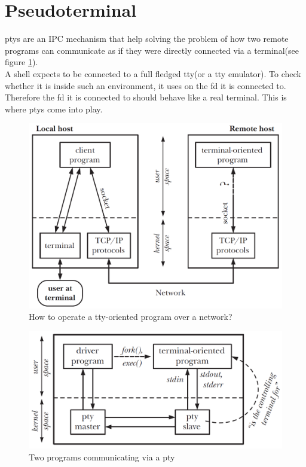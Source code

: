 \documentclass[10pt,a4paper,titlepage,twoside,english,final]{zhawreprt}
\begin{document}
\section{Pseudoterminal}\label{sec:Pseudoterminal}
\glspl{pty} are an \gls{IPC} mechanism that help solving the problem of how two remote programs can communicate as if they were directly connected via a \gls{terminal}(see figure \ref{fig:HowToOperateTtyOrientedProgramOverNetwork}).\\
A \gls{shell} expects to be connected to a full fledged \gls{tty}(or a \gls{tty} emulator). To check whether it is inside such an environment, it uses \cite{isatty} on the \gls{fd} it is connected to. Therefore the \gls{fd} it is connected to should behave like a real \gls{terminal}. This is where \glspl{pty} come into play.
\begin{figure}[ht]
\includegraphics[width=\textwidth]{PseudoterminalProblem}
\caption{How to operate a \gls{tty}-oriented program over a network?\citep[p.1376]{KerriskTLPI}}
\label{fig:HowToOperateTtyOrientedProgramOverNetwork}
\end{figure}
\begin{figure}[ht]
\includegraphics[width=\textwidth]{Pseudoterminal}
\caption{Two programs communicating via a \gls{pty}\citep[p.1377]{KerriskTLPI}}
\label{fig:TwoProgramsCommunicatingViaAPty}
\end{figure}
\end{document}

